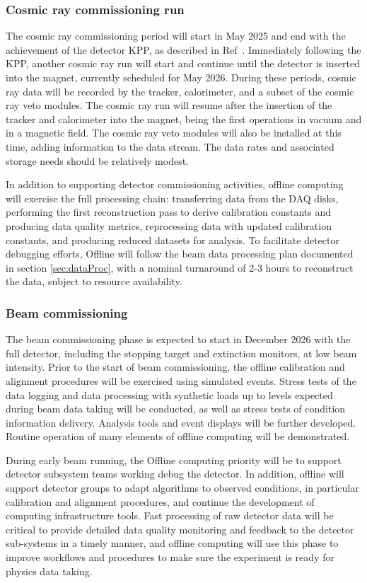 \subsubsection{Cosmic ray commissioning run }
The cosmic ray commissioning period will start in May 2025 and end with the achievement of the detector KPP, as described in Ref~\cite{docdb4665}. Immediately following the KPP, another cosmic ray run will start and continue until the detector is inserted into the magnet, currently scheduled for May 2026. During these periods, cosmic ray data will be recorded by the tracker, calorimeter, and a subset of the cosmic ray veto modules. The cosmic ray run will resume after the insertion of the tracker and calorimeter into the magnet, being the first operations in vacuum and in a magnetic field. The cosmic ray veto modules will also be installed at this time, adding information to the data stream. The data rates and associated storage needs should be relatively modest.

In addition to supporting detector commissioning activities, offline computing will exercise the full processing chain: transferring data from the DAQ disks, performing the first reconstruction pass to derive calibration constants and producing data quality metrics, reprocessing data with updated calibration constants, and producing reduced datasets for analysis. To facilitate detector debugging efforts, Offline will follow the beam data processing plan documented in section \ref{sec:dataProc}, with a nominal turnaround of 2-3 hours to reconstruct the data, subject to resource availability.

\subsubsection{Beam commissioning }

The beam commissioning phase is expected to start in December 2026 with the full detector, including the stopping target and extinction monitors, at low beam intensity. 
Prior to the start of beam commissioning, the offline calibration and alignment procedures will be exercised using simulated events. Stress tests of the data logging and data processing with synthetic loads up to levels expected during \runone beam data taking will be conducted, as well as stress tests of condition information delivery. Analysis tools and event displays will be further developed. Routine operation of many elements of offline computing will be demonstrated.

During early beam running, the Offline computing priority will be to support detector subsystem teams working debug the detector. In addition, offline will support detector groups to adapt algorithms to observed conditions, in particular calibration and alignment procedures, and continue the development of computing infrastructure tools. Fast processing of raw detector data will be critical to provide detailed data quality monitoring and feedback to the detector sub-systems in a timely manner, and offline computing will use this phase to improve workflows and procedures to make sure the experiment is ready for physics data taking.

